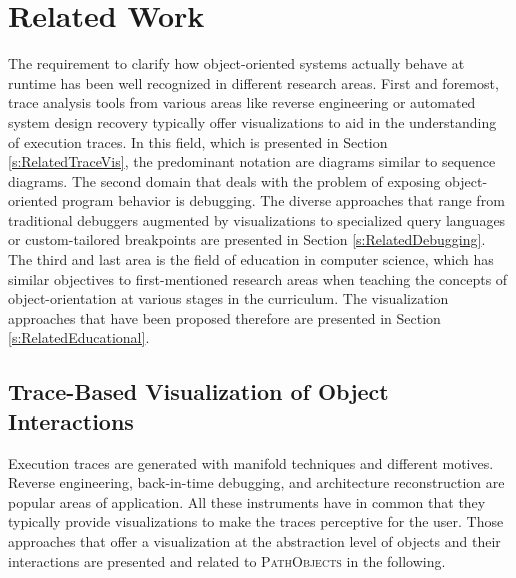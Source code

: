\chapter{Related Work}
\label{c:relatedwork}

The requirement to clarify how object-oriented systems actually behave at runtime has been well recognized in different research areas. First and foremost, trace analysis tools from various areas like reverse engineering or automated system design recovery typically offer visualizations to aid in the understanding of execution traces.
In this field, which is presented in Section \ref{s:RelatedTraceVis}, the predominant notation are diagrams similar to sequence diagrams.
The second domain that deals with the problem of exposing object-oriented program behavior is debugging.
The diverse approaches that range from traditional debuggers augmented by visualizations to specialized query languages or custom-tailored breakpoints are presented in Section \ref{s:RelatedDebugging}.
The third and last area is the field of education in computer science, which has similar objectives to first-mentioned research areas when teaching the concepts of object-orientation at various stages in the curriculum.
The visualization approaches that have been proposed therefore are presented in Section \ref{s:RelatedEducational}.

\section[Trace-Based Visualization of Object Interactions]{Trace-Based Visualization of Object Interactions%
}
\label{s:RelatedTraceVis}
Execution traces are generated with manifold techniques and different motives.
Reverse engineering, back-in-time debugging, and architecture reconstruction are popular areas of application.
All these instruments have in common that they typically provide visualizations to make the traces perceptive for the user.
Those approaches that offer a visualization at the abstraction level of objects and their interactions are presented and related to \textsc{PathObjects} in the following.

